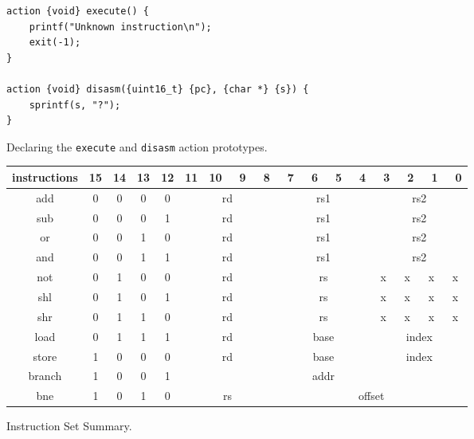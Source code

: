 \begin{figure}[ht]
\begin{verbatim}
action {void} execute() {
    printf("Unknown instruction\n");
    exit(-1);
}

action {void} disasm({uint16_t} {pc}, {char *} {s}) {
    sprintf(s, "?");
}
\end{verbatim}
\caption{Declaring the \texttt{execute} and \texttt{disasm} action prototypes.}
\label{action}
\end{figure}

\begin{figure}[h!tb]
	\begin{center}
		\begin{tabular}{|c|c|c|c|c|c|c|c|c|c|c|c|c|c|c|c|c|}
			\hline
			instructions &  15  &  14  &  13  &  12  &  11  &  10  &  ~9  & ~8  &  ~7  &  ~6  &  ~5  &  ~4  &  ~3  &  ~2  &  ~1  &  ~0 \\
			\hline
			add    &   0  &   0  &   0  &   0  & \multicolumn{4}{|c|}{rd} & \multicolumn{4}{|c|}{rs1} & \multicolumn{4}{|c|}{rs2}\\
			\hline
			sub    &   0  &   0  &   0  &   1  & \multicolumn{4}{|c|}{rd} & \multicolumn{4}{|c|}{rs1} & \multicolumn{4}{|c|}{rs2}\\
			\hline
			or     &   0  &   0  &   1  &   0  & \multicolumn{4}{|c|}{rd} & \multicolumn{4}{|c|}{rs1} & \multicolumn{4}{|c|}{rs2}\\
			\hline
			and    &   0  &   0  &   1  &   1  & \multicolumn{4}{|c|}{rd} & \multicolumn{4}{|c|}{rs1} & \multicolumn{4}{|c|}{rs2}\\
			\hline
			not    &   0  &   1  &   0  &   0  & \multicolumn{4}{|c|}{rd}  & \multicolumn{4}{|c|}{rs} &   x  &   x  &   x  &   x \\
			\hline
			shl    &   0  &   1  &   0  &   1  & \multicolumn{4}{|c|}{rd}  & \multicolumn{4}{|c|}{rs} &   x  &   x  &   x  &   x \\
			\hline
			shr    &   0  &   1  &   1  &   0  & \multicolumn{4}{|c|}{rd}  & \multicolumn{4}{|c|}{rs} &   x  &   x  &   x  &   x \\
			\hline
			load   &   0  &   1  &   1  &   1  & \multicolumn{4}{|c|}{rd}  & \multicolumn{4}{|c|}{base} & \multicolumn{4}{|c|}{index}\\
			\hline
			store  &   1  &   0  &   0  &   0  & \multicolumn{4}{|c|}{rd}  & \multicolumn{4}{|c|}{base} & \multicolumn{4}{|c|}{index}\\
			\hline
			branch &   1  &   0  &   0  &   1  & \multicolumn{12}{|c|}{addr}\\
			\hline
			bne    &   1  &   0  &   1  &   0  & \multicolumn{4}{|c|}{rs} & \multicolumn{8}{|c|}{offset}\\
			\hline
		\end{tabular}
		\caption{Instruction Set Summary.}
		\label{instruction_set_summary}
	\end{center}
\end{figure}

